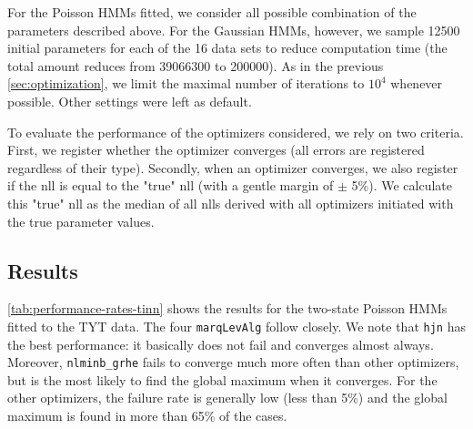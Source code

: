 \documentclass[]{interact}\usepackage[]{graphicx}\usepackage[dvipsnames]{xcolor}
\theoremstyle{plain}%
\theoremstyle{definition}
\theoremstyle{remark}
\begin{document}

For the Poisson HMMs fitted, we consider all possible combination of the parameters described above. For the Gaussian HMMs, however, we sample 12500 initial parameters for each of the 16   data sets to reduce computation time (the total amount reduces from 39066300 to 200000). As in the previous \autoref{sec:optimization}, we limit the maximal number of iterations to \ensuremath{10^{4}} whenever possible. Other settings were left as default. 

To evaluate the performance of the optimizers considered, we rely on two criteria. First, we register whether the optimizer converges (all errors are registered regardless of their type). Secondly, when an optimizer converges, we also register if the nll is equal to the "true" nll (with a gentle margin of $\pm$ 5\%). We calculate this "true" nll as the median of all nlls derived with all optimizers initiated with the true parameter values. 



\subsection{Results}

\autoref{tab:performance-rates-tinn} shows the results for the two-state Poisson HMMs fitted to the TYT data. The four \texttt{marqLevAlg} follow closely. We note that \texttt{hjn} has the best performance: it basically does not fail and converges almost always. Moreover, \texttt{nlminb\_grhe} fails to converge much more often than other optimizers, but is the most likely to find the global maximum when it converges.
For the other optimizers, the failure rate is generally low (less than 5\%) and the global maximum is found in more than 65\% of the cases.
\end{document}

